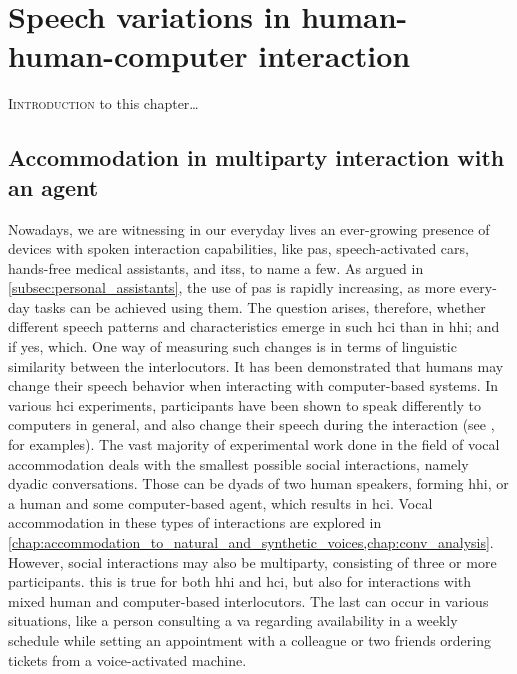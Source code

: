 \chapter{Speech variations in human-human-computer interaction}
\label{chap:speech_variations_in_hhci}

\lettrine{I}{introduction} to this chapter\ldots

\pagebreak

\section{Accommodation in multiparty interaction with an agent}
\label{sec:accommodation_in_multiparty_interaction_with_an_agent}

Nowadays, we are witnessing in our everyday lives an ever-growing presence of devices with spoken interaction capabilities, like \acp{pa}, speech-activated cars, hands-free medical assistants, and \acp{its}, to name a few.
As argued in \cref{subsec:personal_assistants}, the use of \acp{pa} is rapidly increasing, as more every-day tasks can be achieved using them.
The question arises, therefore, whether different speech patterns and characteristics emerge in such \ac{hci} than in \ac{hhi}; and if yes, which.
One way of measuring such changes is in terms of linguistic similarity between the interlocutors.
It has been demonstrated that humans may change their speech behavior when interacting with computer-based systems.
In various \ac{hci} experiments, participants have been shown to speak differently to computers in general, and also change their speech during the interaction (see \citet{Branigan2010linguistic}, for examples).
The vast majority of experimental work done in the field of vocal accommodation deals with the smallest possible social interactions, namely dyadic conversations.
Those can be dyads of two human speakers, forming \ac{hhi}, or a human and some computer-based agent, which results in \ac{hci}.
Vocal accommodation in these types of interactions are explored in \cref{chap:accommodation_to_natural_and_synthetic_voices,chap:conv_analysis}.
However, social interactions may also be multiparty, consisting of three or more participants.
this is true for both \ac{hhi} and \ac{hci}, but also for interactions with mixed human and computer-based interlocutors.
The last can occur in various situations, like a person consulting a \ac{va} regarding availability in a weekly schedule while setting an appointment with a colleague or two friends ordering tickets from a voice-activated machine.

